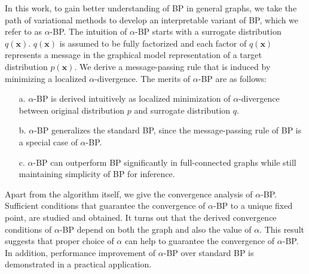 In this work, to gain better understanding of BP in general graphs, we take the path of variational methods to develop an interpretable variant of BP, which we refer to as $\alpha$-BP.
The intuition of $\alpha$-BP starts with a surrogate distribution $q(\bm{x})$. $q(\bm{x})$ is assumed to be fully factorized and each factor of $q(\bm{x})$ represents a message in the graphical model representation of a target distribution $p(\bm{x})$. We derive a message-passing rule that is induced by minimizing a localized $\alpha$-divergence. The merits of $\alpha$-BP are as follows:
\begin{itemize}
\item[a.]{$\alpha$-BP is derived intuitively as localized minimization of $\alpha$-divergence between original distribution $p$ and surrogate distribution $q$.}
\item[b.]{$\alpha$-BP generalizes the standard BP, since the message-passing rule of BP is a special case of $\alpha$-BP.}
\item[c.]{$\alpha$}-BP can outperform BP significantly in full-connected graphs while still maintaining simplicity of BP for inference. 
\end{itemize}
Apart from the algorithm itself, we give the convergence analysis of $\alpha$-BP. Sufficient conditions that guarantee the convergence of $\alpha$-BP to a unique fixed point, are studied and obtained. It turns out that the derived convergence conditions of $\alpha$-BP depend on both the graph and also the value of $\alpha$. This result suggests that proper choice of $\alpha$ can help to guarantee the convergence of $\alpha$-BP. In addition, performance improvement of $\alpha$-BP over standard BP is demonstrated in a practical application.






